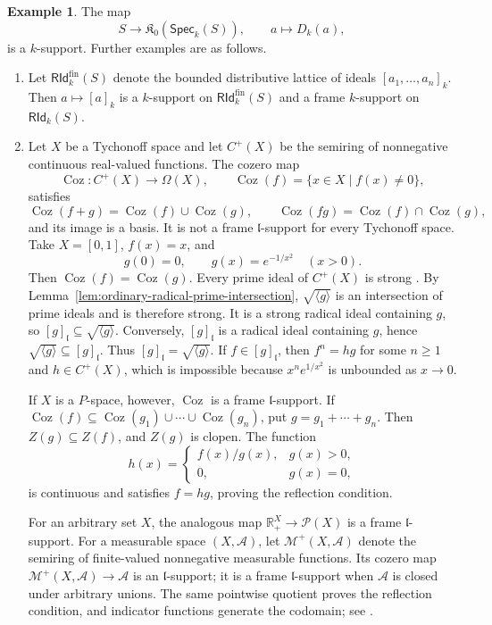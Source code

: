 \documentclass[12pt,leqno]{amsart}
\newcommand{\Speck}{\mathsf{Spec}_{k}}
\newcommand{\RIdk}{\mathsf{RId}_{k}}
\newcommand{\KOpen}{\mathfrak K_{0}}
\newcommand{\Coz}{\operatorname{Coz}}
\theoremstyle{definition}
\newtheorem{example}[theorem]{Example}
\numberwithin{equation}{section}
\theoremstyle{remark}
\begin{document}
\begin{example}\label{ex:canonical-k-support}
The map
\[
S\longrightarrow\KOpen(\Speck(S)),
\qquad
a\longmapsto D_k(a),
\]
is a $k$-support. Further examples are as follows.
\begin{enumerate}
\item Let \(\RIdk^{\mathrm{fin}}(S)\) denote the bounded distributive lattice of ideals \([a_1,\ldots,a_n]_k\). Then
\(a\mapsto[a]_k\) is a $k$-support on \(\RIdk^{\mathrm{fin}}(S)\) and a frame $k$-support on \(\RIdk(S)\).

\item Let $X$ be a Tychonoff space and let \(C^+(X)\) be the semiring of nonnegative continuous real-valued functions. The cozero map
\[
\Coz\colon C^+(X)\longrightarrow\Omega(X),
\qquad
\Coz(f)=\{x\in X\mid f(x)\neq0\},
\]
satisfies
\[
\Coz(f+g)=\Coz(f)\cup\Coz(g),
\qquad
\Coz(fg)=\Coz(f)\cap\Coz(g),
\]
and its image is a basis. It is not a frame $\mathfrak l$-support for every Tychonoff space. Take
\(X=[0,1]\), \(f(x)=x\), and
\[
g(0)=0,
\qquad
g(x)=e^{-1/x^2}\quad(x>0).
\]
Then \(\Coz(f)=\Coz(g)\). Every prime ideal of \(C^+(X)\) is strong \cite[Theorem~3.12]{BiswasFilomat}. By Lemma~\ref{lem:ordinary-radical-prime-intersection}, \(\sqrt{\langle g\rangle}\) is an intersection of prime ideals and is therefore strong. It is a strong radical ideal containing $g$, so
\([g]_{\mathfrak l}\subseteq\sqrt{\langle g\rangle}\). Conversely, \([g]_{\mathfrak l}\) is a radical ideal containing $g$, hence
\(\sqrt{\langle g\rangle}\subseteq[g]_{\mathfrak l}\). Thus
\([g]_{\mathfrak l}=\sqrt{\langle g\rangle}\). If \(f\in[g]_{\mathfrak l}\), then \(f^n=hg\) for some \(n\geq1\) and \(h\in C^+(X)\), which is impossible because
\(x^n e^{1/x^2}\) is unbounded as \(x\rightarrow0\).

If $X$ is a $P$-space, however, \(\Coz\) is a frame $\mathfrak l$-support. If
\(\Coz(f)\subseteq\Coz(g_1)\cup\cdots\cup\Coz(g_n)\), put
\(g=g_1+\cdots+g_n\). Then \(Z(g)\subseteq Z(f)\), and $Z(g)$ is clopen. The function
\[
h(x)=
\begin{cases}
f(x)/g(x),&g(x)>0,\\
0,&g(x)=0,
\end{cases}
\]
is continuous and satisfies \(f=hg\), proving the reflection condition.

For an arbitrary set $X$, the analogous map
\(\mathds{R}_+^X\to\mathcal P(X)\) is a frame $\mathfrak l$-support. For a measurable space \((X,\mathcal A)\), let \(\mathcal M^+(X,\mathcal A)\) denote the semiring of finite-valued nonnegative measurable functions. Its cozero map
\(\mathcal M^+(X,\mathcal A)\to\mathcal A\) is an $\mathfrak l$-support; it is a frame $\mathfrak l$-support when \(\mathcal A\) is closed under arbitrary unions. The same pointwise quotient proves the reflection condition, and indicator functions generate the codomain; see \cite{Measure}.
\end{enumerate}
\end{example}
\end{document}
